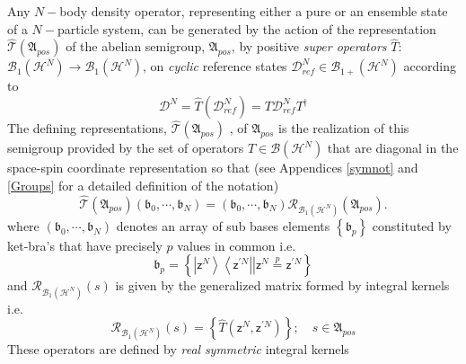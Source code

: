 \documentclass[aps,preprint]{revtex4}%
\begin{document}
Any $N-$body density operator, representing either a pure or an ensemble state
of a $N-$particle system, can be generated by the action of the representation
$\mathcal{\hat{T}}\left(  \mathfrak{A}_{pos}\right)  $ of the abelian
semigroup, $\mathfrak{A}_{pos}$, by positive \textit{super operators} $\hat
{T}$:$\mathcal{B}_{1}\left(  \mathcal{H}^{N}\right)  \rightarrow
\mathcal{B}_{1}\left(  \mathcal{H}^{N}\right)  $, on \textit{cyclic }reference
states $\mathcal{D}_{ref}^{N}\in\mathcal{B}_{1+}\left(  \mathcal{H}%
^{N}\right)  $ \cite{Weiner2002} according to
\begin{equation}
\mathcal{D}^{N}=\hat{T}\left(  \mathcal{D}_{ref}^{N}\right)  =T\mathcal{D}%
_{ref}^{N}T^{\dagger} \label{GP}%
\end{equation}
The defining representations, $\mathcal{\hat{T}}\left(  \mathfrak{A}%
_{pos}\right)  $ \cite{notation1}, of $\mathfrak{A}_{pos}$ is the realization
of this semigroup provided by the set of operators $T\in\mathcal{B}\left(
\mathcal{H}^{N}\right)  $ that are diagonal in the space-spin coordinate
representation so that (see Appendices \ref{symnot} and \ref{Groups} for a
detailed definition of the notation)
\begin{equation}
\mathcal{\hat{T}}\left(  \mathfrak{A}_{pos}\right)  \left(  \mathfrak{b}%
_{0},\cdots,\mathfrak{b}_{N}\right)  =\left(  \mathfrak{b}_{0},\cdots
,\mathfrak{b}_{N}\right)  \mathcal{R}_{\mathcal{B}_{1}\left(  \mathcal{H}%
^{N}\right)  }\left(  \mathfrak{A}_{pos}\right)  .
\end{equation}
where $\left(  \mathfrak{b}_{0},\cdots,\mathfrak{b}_{N}\right)  $ denotes an
array of sub bases elements $\left\{  \mathfrak{b}_{p}\right\}  $ constituted
by ket-bra's that have precisely $p$ values in common i.e.
\begin{equation}
\mathfrak{b}_{p}=\left\{  \left.  \left\vert \mathsf{z}^{N}\right\rangle
\left\langle \mathsf{z}^{\prime N}\right\vert \right\vert \mathsf{z}%
^{N}\overset{p}{=}\mathsf{z}^{\prime N}\right\}
\end{equation}
and $\mathcal{R}_{\mathcal{B}_{1}\left(  \mathcal{H}^{N}\right)  }\left(
s\right)  $ is given by the generalized matrix formed by integral kernels i.e.%
\begin{equation}
\mathcal{R}_{\mathcal{B}_{1}\left(  \mathcal{H}^{N}\right)  }\left(  s\right)
=\left\{  \hat{T}\left(  \mathsf{z}^{N},\mathsf{z}^{\prime N}\right)
\right\}  ;\quad s\in\mathfrak{A}_{pos}%
\end{equation}
These operators are defined by \emph{real} \emph{symmetric }integral kernels
\end{document}
